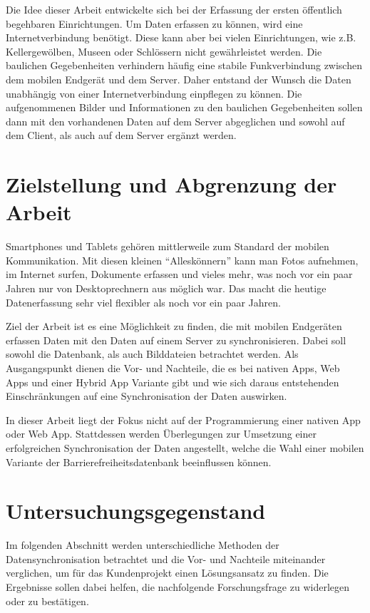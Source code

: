 Die Idee dieser Arbeit entwickelte sich bei der Erfassung der ersten öffentlich begehbaren Einrichtungen. Um Daten erfassen zu können, wird eine Internetverbindung benötigt. Diese kann aber bei vielen Einrichtungen, wie z.B. Kellergewölben, Museen oder Schlössern nicht gewährleistet werden. Die baulichen Gegebenheiten verhindern häufig eine stabile Funkverbindung zwischen dem mobilen Endgerät und dem Server. Daher entstand der Wunsch die Daten unabhängig von einer Internetverbindung einpflegen zu können. Die aufgenommenen Bilder und Informationen zu den baulichen Gegebenheiten sollen dann mit den vorhandenen Daten auf dem Server abgeglichen und sowohl auf dem Client, als auch auf dem Server ergänzt werden.

\section{Zielstellung und Abgrenzung der Arbeit}
\label{sec:goal:goal}

Smartphones und Tablets gehören mittlerweile zum Standard der mobilen Kommunikation. Mit diesen kleinen ``Alleskönnern'' kann man Fotos aufnehmen, im Internet surfen, Dokumente erfassen und vieles mehr, was noch vor ein paar Jahren nur von Desktoprechnern aus möglich war. Das macht die heutige Datenerfassung sehr viel flexibler als noch vor ein paar Jahren.

Ziel der Arbeit ist es eine Möglichkeit zu finden, die mit mobilen Endgeräten erfassen Daten mit den Daten auf einem Server zu synchronisieren. Dabei soll sowohl die Datenbank, als auch Bilddateien betrachtet werden. Als Ausgangspunkt dienen die Vor- und Nachteile, die es bei nativen Apps, Web Apps und einer Hybrid App Variante gibt und wie sich daraus entstehenden Einschränkungen auf eine Synchronisation der Daten auswirken.

In dieser Arbeit liegt der Fokus nicht auf der Programmierung einer nativen App oder Web App. Stattdessen werden Überlegungen zur Umsetzung einer erfolgreichen Synchronisation der Daten angestellt, welche die Wahl einer mobilen Variante der Barrierefreiheitsdatenbank beeinflussen können.

\section{Untersuchungsgegenstand}
\label{sec:investigation:inv}

Im folgenden Abschnitt werden unterschiedliche Methoden der Datensynchronisation betrachtet und die Vor- und Nachteile miteinander verglichen, um für das Kundenprojekt einen Lösungsansatz zu finden. Die Ergebnisse sollen dabei helfen, die nachfolgende Forschungsfrage zu widerlegen oder zu bestätigen.

